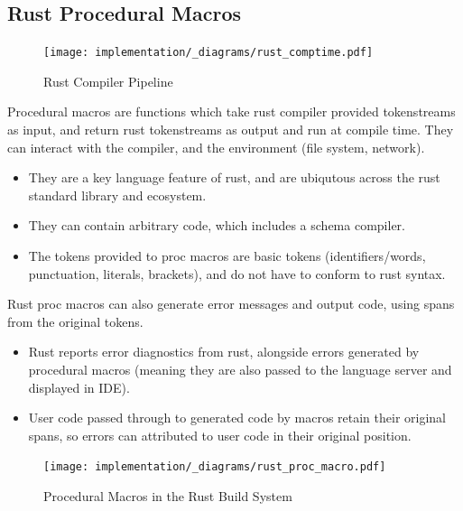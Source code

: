\subsection{Rust Procedural Macros}
\begin{figure}[h!]
    \centering
    \texttt{[image: implementation/\_diagrams/rust\_comptime.pdf]}
    \caption{Rust Compiler Pipeline}
\end{figure}
\noindent
Procedural macros are functions which take rust compiler provided tokenstreams as input, and return rust tokenstreams as output and run at compile time. They can interact with the compiler, and the environment (file system, network).
\begin{itemize}
    \setlength\itemsep{0em}
    \item They are a key language feature of rust, and are ubiqutous across the rust standard library and ecosystem.
    \item They can contain arbitrary code, which includes a schema compiler.
    \item The tokens provided to proc macros are basic tokens (identifiers/words, punctuation, literals, brackets), and do not have to conform to rust syntax.
\end{itemize}
Rust proc macros can also generate error messages and output code, using spans from the original tokens.
\begin{itemize}
    \setlength\itemsep{0em}
    \item Rust reports error diagnostics from rust, alongside errors generated by procedural macros (meaning they are also passed to the language server and displayed in IDE).
    \item User code passed through to generated code by macros retain their original spans, so errors can attributed to user code in their original position.
\end{itemize}
\begin{figure}[h!]
    \centering
    \texttt{[image: implementation/\_diagrams/rust\_proc\_macro.pdf]}
    \caption{Procedural Macros in the Rust Build System}
\end{figure}

